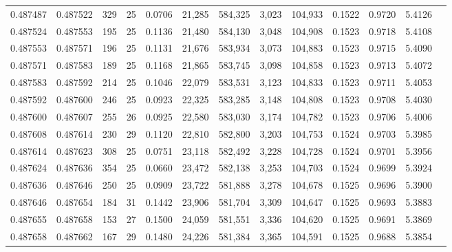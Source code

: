 \begin{tabular}{rrrrrrrrrrrrr}
0.487487 & 0.487522 & 329 &  25 &                                     0.0706 &  21,285 & 584,325 &   3,023 & 104,933 & 0.1522 & 0.9720 & 5.4126 \\
0.487524 & 0.487553 & 195 &  25 &                                     0.1136 &  21,480 & 584,130 &   3,048 & 104,908 & 0.1523 & 0.9718 & 5.4108 \\
0.487553 & 0.487571 & 196 &  25 &                                     0.1131 &  21,676 & 583,934 &   3,073 & 104,883 & 0.1523 & 0.9715 & 5.4090 \\
0.487571 & 0.487583 & 189 &  25 &                                     0.1168 &  21,865 & 583,745 &   3,098 & 104,858 & 0.1523 & 0.9713 & 5.4072 \\
0.487583 & 0.487592 & 214 &  25 &                                     0.1046 &  22,079 & 583,531 &   3,123 & 104,833 & 0.1523 & 0.9711 & 5.4053 \\
0.487592 & 0.487600 & 246 &  25 &                                     0.0923 &  22,325 & 583,285 &   3,148 & 104,808 & 0.1523 & 0.9708 & 5.4030 \\
0.487600 & 0.487607 & 255 &  26 &                                     0.0925 &  22,580 & 583,030 &   3,174 & 104,782 & 0.1523 & 0.9706 & 5.4006 \\
0.487608 & 0.487614 & 230 &  29 &                                     0.1120 &  22,810 & 582,800 &   3,203 & 104,753 & 0.1524 & 0.9703 & 5.3985 \\
0.487614 & 0.487623 & 308 &  25 &                                     0.0751 &  23,118 & 582,492 &   3,228 & 104,728 & 0.1524 & 0.9701 & 5.3956 \\
0.487624 & 0.487636 & 354 &  25 &                                     0.0660 &  23,472 & 582,138 &   3,253 & 104,703 & 0.1524 & 0.9699 & 5.3924 \\
0.487636 & 0.487646 & 250 &  25 &                                     0.0909 &  23,722 & 581,888 &   3,278 & 104,678 & 0.1525 & 0.9696 & 5.3900 \\
0.487646 & 0.487654 & 184 &  31 &                                     0.1442 &  23,906 & 581,704 &   3,309 & 104,647 & 0.1525 & 0.9693 & 5.3883 \\
0.487655 & 0.487658 & 153 &  27 &                                     0.1500 &  24,059 & 581,551 &   3,336 & 104,620 & 0.1525 & 0.9691 & 5.3869 \\
0.487658 & 0.487662 & 167 &  29 &                                     0.1480 &  24,226 & 581,384 &   3,365 & 104,591 & 0.1525 & 0.9688 & 5.3854 \\

\end{tabular}
